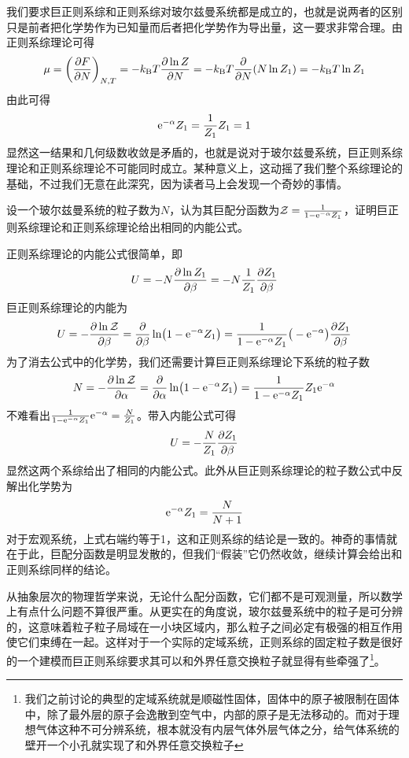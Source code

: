 \documentclass[../../main.tex]{subfiles}
\begin{document}
我们要求巨正则系综和正则系综对玻尔兹曼系统都是成立的，也就是说两者的区别只是前者把化学势作为已知量而后者把化学势作为导出量，这一要求非常合理。由正则系综理论可得
\begin{equation}
    \mu=\left(\pdv{F}{N}\right)_{N,T}=-k_{\mathrm{B}} T\pdv{\ln Z}{N}=-k_{\mathrm{B}} T\pdv{N}(N\ln Z_1)=-k_{\mathrm{B}} T\ln Z_1
\end{equation}
由此可得
\begin{equation}
    \mathrm{e}^{-\alpha}Z_1=\frac{1}{Z_1}Z_1=1
\end{equation}
显然这一结果和几何级数收敛是矛盾的，也就是说对于玻尔兹曼系统，巨正则系综理论和正则系综理论不可能同时成立。某种意义上，这动摇了我们整个系综理论的基础，不过我们无意在此深究，因为读者马上会发现一个奇妙的事情。
\begin{example}
    设一个玻尔兹曼系统的粒子数为\(N\)，认为其巨配分函数为\(\mathcal{Z}=\frac{1}{1-\mathrm{e}^{-\alpha}Z_1}\)，证明巨正则系综理论和正则系综理论给出相同的内能公式。
    \begin{solution}
        正则系综理论的内能公式很简单，即
        \begin{equation}
            U=-N\pdv{\ln Z_1}{\beta}=-N\frac{1}{Z_1}\pdv{Z_1}{\beta}
        \end{equation}
        巨正则系综理论的内能为
        \begin{equation}
            U=-\pdv{\ln\mathcal{Z}}{\beta}=\pdv{\beta}\ln(1-\mathrm{e}^{-\alpha}Z_1)=\frac{1}{1-\mathrm{e}^{-\alpha}Z_1}\big(-\mathrm{e}^{-\alpha}\big)\pdv{Z_1}{\beta}
        \end{equation}
        为了消去公式中的化学势，我们还需要计算巨正则系综理论下系统的粒子数
        \begin{equation}
            N=-\pdv{\ln\mathcal{Z}}{\alpha}=\pdv{\alpha}\ln(1-\mathrm{e}^{-\alpha}Z_1)=\frac{1}{1-\mathrm{e}^{-\alpha}Z_1}Z_1\mathrm{e}^{-\alpha}
        \end{equation}
        不难看出\(\frac{1}{1-\mathrm{e}^{-\alpha}Z_1}\mathrm{e}^{-\alpha}=\frac{N}{Z_1}\)。带入内能公式可得
        \begin{equation}
            U=-\frac{N}{Z_1}\pdv{Z_1}{\beta}
        \end{equation}
        显然这两个系综给出了相同的内能公式。此外从巨正则系综理论的粒子数公式中反解出化学势为
        \begin{equation}
            \mathrm{e}^{-\alpha}Z_1=\frac{N}{N+1}
        \end{equation}
        对于宏观系统，上式右端约等于1，这和正则系综的结论是一致的。神奇的事情就在于此，巨配分函数是明显发散的，但我们“假装”它仍然收敛，继续计算会给出和正则系综同样的结论。

        从抽象层次的物理哲学来说，无论什么配分函数，它们都不是可观测量，所以数学上有点什么问题不算很严重。从更实在的角度说，玻尔兹曼系统中的粒子是可分辨的，这意味着粒子粒子局域在一小块区域内，那么粒子之间必定有极强的相互作用使它们束缚在一起。这样对于一个实际的定域系统，正则系综的固定粒子数是很好的一个建模而巨正则系综要求其可以和外界任意交换粒子就显得有些牵强了\footnote{我们之前讨论的典型的定域系统就是顺磁性固体，固体中的原子被限制在固体中，除了最外层的原子会逸散到空气中，内部的原子是无法移动的。而对于理想气体这种不可分辨系统，根本就没有内层气体外层气体之分，给气体系统的壁开一个小孔就实现了和外界任意交换粒子}。
    \end{solution}
\end{example}
\end{document}
